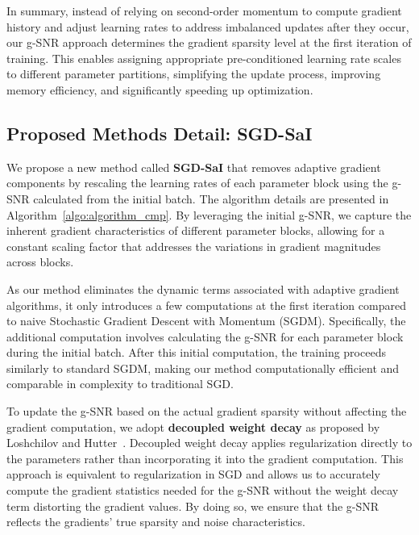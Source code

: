 In summary, instead of relying on second-order momentum to compute gradient history and adjust learning rates to address imbalanced updates after they occur, our g-SNR approach determines the gradient sparsity level at the first iteration of training. This enables assigning appropriate pre-conditioned learning rate scales to different parameter partitions, simplifying the update process, improving memory efficiency, and significantly speeding up optimization.



\subsection{Proposed Methods Detail: SGD-SaI}
We propose a new method called \textbf{SGD-SaI} that removes adaptive gradient components by rescaling the learning rates of each parameter block using the g-SNR calculated from the initial batch. The algorithm details are presented in Algorithm~\ref{algo:algorithm_cmp}. By leveraging the initial g-SNR, we capture the inherent gradient characteristics of different parameter blocks, allowing for a constant scaling factor that addresses the variations in gradient magnitudes across blocks.

As our method eliminates the dynamic terms associated with adaptive gradient algorithms, it only introduces a few computations at the first iteration compared to naive Stochastic Gradient Descent with Momentum (SGDM). Specifically, the additional computation involves calculating the g-SNR for each parameter block during the initial batch. After this initial computation, the training proceeds similarly to standard SGDM, making our method computationally efficient and comparable in complexity to traditional SGD.

To update the g-SNR based on the actual gradient sparsity without affecting the gradient computation, we adopt \textbf{decoupled weight decay} as proposed by Loshchilov and Hutter~\cite{loshchilov2019decoupled}. Decoupled weight decay applies regularization directly to the parameters rather than incorporating it into the gradient computation. This approach is equivalent to regularization in SGD and allows us to accurately compute the gradient statistics needed for the g-SNR without the weight decay term distorting the gradient values. By doing so, we ensure that the g-SNR reflects the gradients' true sparsity and noise characteristics.

